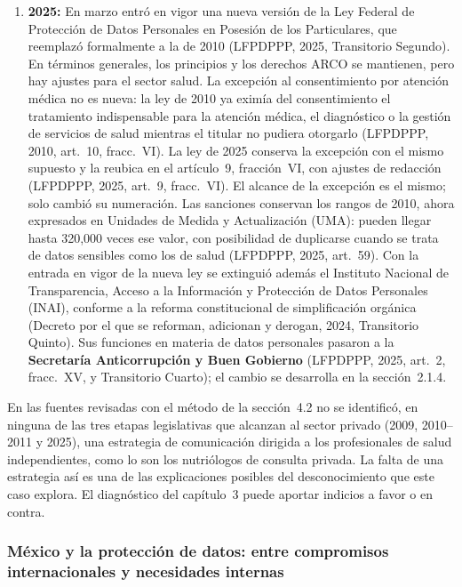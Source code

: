 \documentclass[12pt, a4paper]{article}
\begin{document}
\begin{enumerate}[label=\Roman*.]
  \item \textbf{2025:} En marzo entró en vigor una nueva versión de la
  Ley Federal de Protección de Datos Personales en Posesión de los
  Particulares, que reemplazó formalmente a la de 2010 (LFPDPPP,
  2025, Transitorio Segundo). En términos generales, los principios
  y los derechos ARCO se mantienen, pero hay ajustes para el sector
  salud. La excepción al consentimiento por atención médica no es nueva:
  la ley de 2010 ya eximía del consentimiento el tratamiento indispensable
  para la atención médica, el diagnóstico o la gestión de servicios de
  salud mientras el titular no pudiera otorgarlo (LFPDPPP, 2010, art.~10,
  fracc.~VI). La ley de 2025 conserva la excepción con el mismo supuesto y
  la reubica en el artículo~9, fracción~VI, con ajustes de redacción
  (LFPDPPP, 2025, art.~9, fracc.~VI). El alcance de la excepción es el
  mismo; solo cambió su numeración. Las sanciones conservan los rangos de
  2010, ahora expresados en Unidades de Medida y Actualización (UMA):
  pueden llegar hasta 320,000 veces ese valor, con posibilidad de
  duplicarse cuando se trata de datos sensibles como los de salud
  (LFPDPPP, 2025, art.~59). Con la entrada en vigor de la nueva ley se
  extinguió además el Instituto Nacional de Transparencia, Acceso a la
  Información y Protección de Datos Personales (INAI), conforme a la
  reforma constitucional de simplificación orgánica (Decreto por el que se
  reforman, adicionan y derogan, 2024, Transitorio Quinto). Sus funciones
  en materia de datos personales pasaron a la \textbf{Secretaría
  Anticorrupción y Buen Gobierno} (LFPDPPP, 2025, art.~2, fracc.~XV, y
  Transitorio Cuarto); el cambio se desarrolla en la sección~2.1.4.
 
\end{enumerate}
 
En las fuentes revisadas con el método de la sección~4.2 no se
identificó, en ninguna de las tres etapas legislativas que alcanzan
al sector privado (2009, 2010--2011 y 2025), una estrategia de
comunicación dirigida a los profesionales de salud
independientes, como lo son los nutriólogos de consulta privada. La
falta de una estrategia así es una de las explicaciones posibles del
desconocimiento que este caso explora. El diagnóstico del capítulo~3
puede aportar indicios a favor o en contra.
 
\subsubsection{México y la protección de datos: entre compromisos
internacionales y necesidades internas}
 
\end{document}
